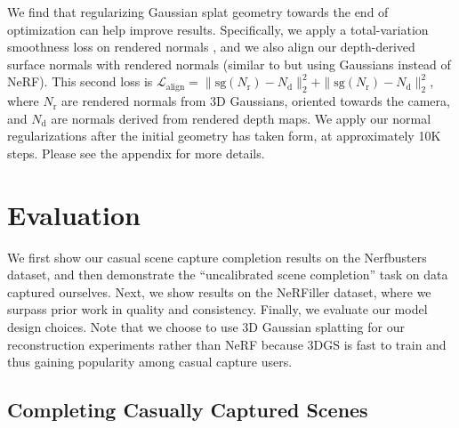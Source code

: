 %
We find that regularizing Gaussian splat geometry towards the end of optimization can help improve results. Specifically, we apply a total-variation smoothness loss on rendered normals \cite{fridovich2022plenoxels}, and we also align our depth-derived surface normals with rendered normals (similar to \citet{verbin2024nerf} but using Gaussians instead of NeRF).
This second loss is $\mathcal{L}_\text{align} = \|\mathrm{sg}(N_\text{r}) - N_\text{d}\|^{2}_{2} + \|\mathrm{sg}(N_\text{r}) - N_\text{d}\|^{2}_{2}$, where $N_\text{r}$ are rendered normals from 3D Gaussians, oriented towards the camera, and $N_\text{d}$ are normals derived from rendered depth maps.
We apply our normal regularizations after the initial geometry has taken form, at approximately 10K steps.
Please see the appendix for more details.

\vspace{-7px}
\section{Evaluation}
\vspace{-8px}
We first show our casual scene capture completion results on the Nerfbusters dataset, and then demonstrate the ``uncalibrated scene completion'' task on data captured ourselves.
Next, we show results on the NeRFiller dataset, where we surpass prior work in quality and consistency.
Finally, we evaluate our model design choices.
Note that we choose to use 3D Gaussian splatting \cite{kerbl20233d} for our reconstruction experiments rather than NeRF \cite{mildenhall2021nerf} because 3DGS is fast to train and thus gaining popularity among casual capture users.


\subsection{Completing Casually Captured Scenes}
\label{sec:completing_casual_captures}
\vspace{-5px}

